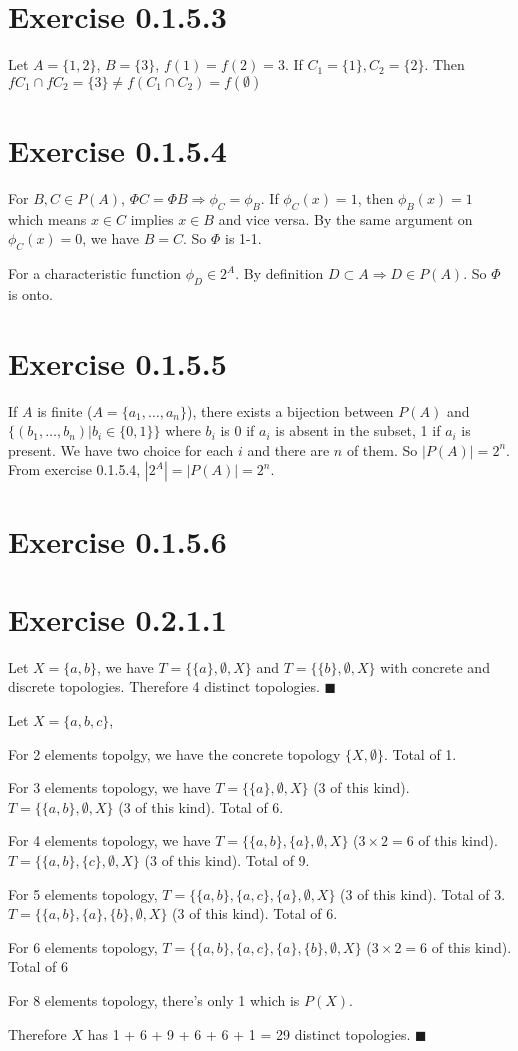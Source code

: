 \documentclass[12pt]{article}
\begin{document}
\section*{Exercise 0.1.5.3}
Let $A = \{1, 2\}$, $B =\{3\}$,  $f(1) = f(2) = 3$. If $C_1 = \{1\}, C_2=\{2\}$. Then $fC_1 \cap fC_2 = \{3\} \neq f(C_1 \cap C_2) = f (\emptyset)$

\section*{Exercise 0.1.5.4}
For $B, C \in P(A)$, $\Phi C = \Phi B \Rightarrow \phi_C = \phi_B$. If $\phi_C (x) = 1$,  then $\phi_B(x) = 1$ which means $x \in C$ implies $x \in B$ and vice versa. By the same argument on $\phi_C(x) = 0$, we have $B = C$. So $\Phi$ is 1-1.

For a characteristic function $\phi_D \in 2^A$. By definition $D \subset A \Rightarrow D \in P(A)$. So $\Phi$ is onto. 


\section*{Exercise 0.1.5.5}
If $A$ is finite ($A =\{a_1, \ldots, a_n \}$), there exists a bijection between $P(A)$ and $\{(b_1, \ldots, b_n) | b_i \in \{0, 1\} \}$ where $b_i$ is 0 if $a_i$ is absent in the subset, 1 if $a_i$ is present. We have two choice for each $i$ and there are $n$ of them. So $|P(A)| = 2^n$. From exercise 0.1.5.4, $|2^A| = |P(A)| = 2^n$.

\section*{Exercise 0.1.5.6}

\section*{Exercise 0.2.1.1}
Let $X = \{a, b\}$, we have $T=\{\{a\}, \emptyset, X\}$ and $T=\{\{b\}, \emptyset, X\}$ with concrete and discrete topologies. Therefore 4 distinct topologies. $\blacksquare$

Let $X = \{a, b, c\}$, 

For 2 elements topolgy, we have the concrete topology $\{X, \emptyset\}$. Total of 1.

For 3 elements topology, we have $T=\{\{a\}, \emptyset, X\}$ (3 of this kind).  $T=\{\{a, b\}, \emptyset, X\}$ (3 of this kind). Total of 6. 

For 4 elements topology, we have $T=\{\{a, b\}, \{a\}, \emptyset, X\}$ ($3 \times 2 = 6$ of this kind). $T=\{\{a, b\}, \{c\}, \emptyset, X\}$ (3 of this kind). Total of 9.

For 5 elements topology, $T=\{\{a, b\}, \{a, c\}, \{a\}, \emptyset, X\}$ (3 of this kind). Total of 3. $T=\{\{a, b\}, \{a\}, \{b\}, \emptyset, X\}$ (3 of this kind). Total of 6.

For 6 elements topology,  $T=\{\{a, b\}, \{a, c\}, \{a\}, \{b\}, \emptyset, X\}$ ($3 \times 2=6$ of this kind). Total of 6

For 8 elements topology, there's only 1 which is $P(X)$. 

Therefore $X$ has 1 + 6 + 9 + 6 + 6 + 1 = 29 distinct topologies. $\blacksquare$
\end{document}
